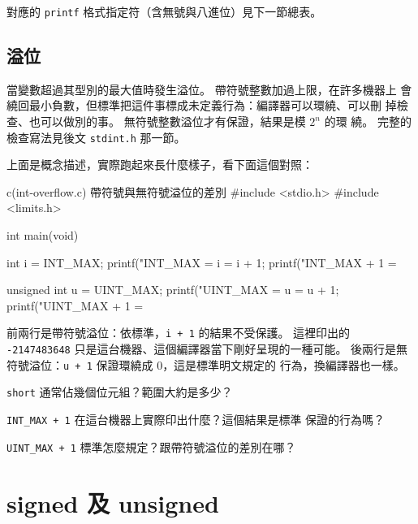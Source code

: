 對應的 \texttt{printf} 格式指定符（含無號與八進位）見下一節總表。

\subsection{溢位}

當變數超過其型別的最大值時發生溢位。 帶符號整數加過上限，在許多機器上
會繞回最小負數，但標準把這件事標成未定義行為：編譯器可以環繞、可以刪
掉檢查、也可以做別的事。 無符號整數溢位才有保證，結果是模 $2^n$ 的環
繞。 完整的檢查寫法見後文 \texttt{stdint.h} 那一節。

上面是概念描述，實際跑起來長什麼樣子，看下面這個對照：

\begin{example}{c}{(int-overflow.c) 帶符號與無符號溢位的差別}
#include <stdio.h>
#include <limits.h>

int main(void) {
    int i = INT_MAX;
    printf("INT_MAX = %
    i = i + 1;
    printf("INT_MAX + 1 = %

    unsigned int u = UINT_MAX;
    printf("UINT_MAX = %
    u = u + 1;
    printf("UINT_MAX + 1 = %
}
\end{example}



前兩行是帶符號溢位：依標準，\texttt{i + 1} 的結果不受保護。 這裡印出的
\texttt{-2147483648} 只是這台機器、這個編譯器當下剛好呈現的一種可能。
後兩行是無符號溢位：\texttt{u + 1} 保證環繞成 $0$，這是標準明文規定的
行為，換編譯器也一樣。

\begin{drills}[label=drills:decl-int-sizes]
\item \texttt{short} 通常佔幾個位元組？範圍大約是多少？
\item \texttt{INT\_MAX + 1} 在這台機器上實際印出什麼？這個結果是標準
保證的行為嗎？
\item \texttt{UINT\_MAX + 1} 標準怎麼規定？跟帶符號溢位的差別在哪？
\end{drills}

\section{signed 及 unsigned}
\label{sec:decl-signed-unsigned}

